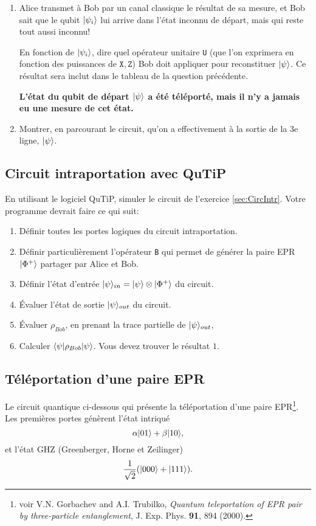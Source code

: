 \begin{enumerate}
\item Alice transmet à Bob par un canal classique le résultat de sa mesure, et
Bob sait que le qubit $\vert\psi_{i}\rangle$ lui arrive dans l'état inconnu de départ,
mais qui reste tout aussi inconnu!

En fonction de $\vert\psi_{i}\rangle$, dire quel opérateur unitaire \texttt{U} (que
l'on exprimera en fonction des puissances de $\mathtt{X},\mathtt{Z}$) Bob doit
appliquer pour reconstituer $\vert\psi\rangle$. Ce résultat sera inclut dans le
tableau de la question précédente.

\textbf{ L'état du qubit de départ $\vert\psi\rangle$ a été téléporté, mais il n'y a
jamais eu une mesure de cet état.}

\item Montrer, en parcourant le circuit, qu'on a effectivement à la sortie de
la 3e ligne, $\vert\psi\rangle$.

\end{enumerate}

\subsection{Circuit intraportation avec QuTiP}
En utilisant le logiciel QuTiP, simuler le circuit de l'exercice 
\ref{sec:CircIntr}. Votre programme devrait faire ce qui suit:

\begin{enumerate}
\item Définir toutes les portes logiques du circuit intraportation.
\item Définir particulièrement l'opérateur \texttt{B} qui permet de générer 
la paire EPR $\vert\Phi^{+}\rangle$ partager par Alice et Bob.
\item Définir l'état d'entrée $\vert\psi\rangle_{in}=\vert\psi\rangle\otimes\vert\Phi^{+}\rangle$ 
du circuit.
\item Évaluer l'état de sortie $\vert\psi\rangle_{out}$ du circuit.
\item Évaluer $\rho_{Bob}$, en prenant la trace partielle de $\vert\psi\rangle_{out}$,
\item Calculer $\langle\psi\vert\rho_{Bob}\vert\psi\rangle$. Vous devez trouver le résultat $1$.
\end{enumerate}


\subsection{Téléportation d'une paire EPR}

Le circuit quantique ci-dessous qui présente la téléportation d'une paire 
EPR\footnote{voir V.N. Gorbachev and A.I. Trubilko, \emph{Quantum teleportation 
of EPR pair by three-particle entanglement}, J. Exp. Phys. \textbf{91}, 894 
(2000).}. Les premières portes génèrent l'état intriqué%
\begin{equation}
\alpha\ket{01} +\beta\ket{10} ,
\label{eq:EPRTelep}%
\end{equation}
et l'état GHZ (Greenberger, Horne et Zeilinger)%
\begin{equation}
\frac{1}{\sqrt{2}}(\vert000\rangle+\vert111\rangle).
\end{equation}

